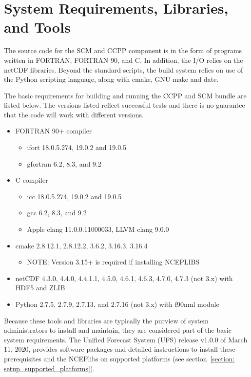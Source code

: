 \section{System Requirements, Libraries, and Tools}
\label{section: systemrequirements}

The source code for the SCM and CCPP component is in the form of programs written in FORTRAN, FORTRAN 90, and C. In addition, the I/O relies on the netCDF libraries. Beyond the standard scripts, the build system relies on use of the Python scripting language, along with cmake, GNU make and date.

The basic requirements for building and running the CCPP and SCM bundle are listed below. The versions listed reflect successful tests and there is no guarantee that the code will work with different versions.
\begin{itemize}
    \item FORTRAN 90+ compiler
    	\begin{itemize}
   	 \item ifort 18.0.5.274, 19.0.2 and 19.0.5
	 \item gfortran 6.2, 8.3, and 9.2
	 \end{itemize}
    \item C compiler
    	\begin{itemize}
	\item icc 18.0.5.274, 19.0.2 and 19.0.5
	\item gcc 6.2, 8.3, and 9.2
	\item Apple clang 11.0.0.11000033, LLVM clang 9.0.0
	\end{itemize}
    \item cmake 2.8.12.1, 2.8.12.2, 3.6.2, 3.16.3, 3.16.4
    	\begin{itemize}
	\item NOTE: Version 3.15+ is required if installing NCEPLIBS
	\end{itemize}
   	 \item netCDF 4.3.0, 4.4.0, 4.4.1.1, 4.5.0, 4.6.1, 4.6.3, 4.7.0, 4.7.3 (not 3.x) with HDF5 and ZLIB
    \item Python 2.7.5, 2.7.9, 2.7.13, and 2.7.16 (not 3.x) with f90nml module
\end{itemize}

Because these tools and libraries are typically the purview of system administrators to install and maintain, they are considered  part of the basic system requirements. The Unified Forecast System (UFS) release v1.0.0 of March 11, 2020, provides software packages and detailed instructions to install these prerequisites and the NCEPlibs on supported platforms (see section~\ref{section: setup_supported_platforms}).

